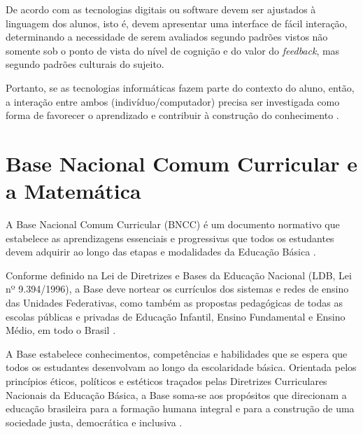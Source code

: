 De acordo com  as tecnologias digitais ou software devem ser ajustados à linguagem dos alunos, isto é, devem apresentar uma interface de fácil interação, determinando a necessidade de serem avaliados segundo padrões vistos não somente sob o ponto de vista do nível de cognição e do valor do \textit{feedback}, mas segundo padrões culturais do sujeito.

Portanto, se as tecnologias informáticas fazem parte do contexto do aluno, então, a interação entre ambos (indivíduo/computador) precisa ser investigada como forma de favorecer o aprendizado e contribuir à construção do conhecimento \cite{richit2004implicaccoes}.





\section{Base Nacional Comum Curricular e a Matemática}
\label{bncc_mat}

A Base Nacional Comum Curricular (BNCC) é um documento normativo que estabelece as aprendizagens essenciais e progressivas que todos os estudantes devem adquirir ao longo das etapas e modalidades da Educação Básica \cite{bncc}.


Conforme definido na Lei de Diretrizes e Bases da Educação Nacional (LDB, Lei nº 9.394/1996), a Base deve nortear os currículos dos sistemas e redes de ensino das Unidades Federativas, como também as propostas pedagógicas de todas as escolas públicas e privadas de Educação Infantil, Ensino Fundamental e Ensino Médio, em todo o Brasil \cite{bncc}.

A Base estabelece conhecimentos, competências e habilidades que se espera que todos os estudantes desenvolvam ao longo da escolaridade básica. Orientada pelos princípios éticos, políticos e estéticos traçados pelas Diretrizes Curriculares Nacionais da Educação Básica, a Base soma-se aos propósitos que direcionam a educação brasileira para a formação humana integral e para a construção de uma sociedade justa, democrática e inclusiva \cite{bncc}.







